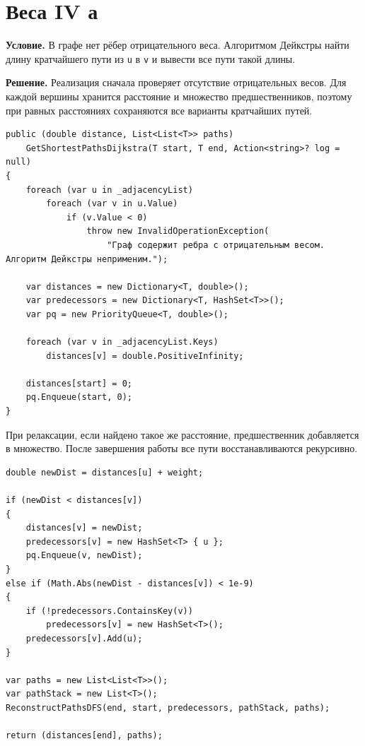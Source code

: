 \documentclass[pract]{SCWorks}
\newcommand{\smalltt}[1]{{\footnotesize\texttt{#1}}}
\begin{document}
    \section{Веса IV а}

    \textbf{Условие.}
    В графе нет рёбер отрицательного веса.
    Алгоритмом Дейкстры найти длину кратчайшего пути из \smalltt{u} в \smalltt{v} и вывести все пути такой длины.

    \textbf{Решение.}
    Реализация сначала проверяет отсутствие отрицательных весов.
    Для каждой вершины хранится расстояние и множество предшественников, поэтому при равных расстояниях сохраняются все варианты кратчайших путей.

    \begin{verbatim}
public (double distance, List<List<T>> paths)
    GetShortestPathsDijkstra(T start, T end, Action<string>? log = null)
{
    foreach (var u in _adjacencyList)
        foreach (var v in u.Value)
            if (v.Value < 0)
                throw new InvalidOperationException(
                    "Граф содержит ребра с отрицательным весом. Алгоритм Дейкстры неприменим.");

    var distances = new Dictionary<T, double>();
    var predecessors = new Dictionary<T, HashSet<T>>();
    var pq = new PriorityQueue<T, double>();

    foreach (var v in _adjacencyList.Keys)
        distances[v] = double.PositiveInfinity;

    distances[start] = 0;
    pq.Enqueue(start, 0);
}
    \end{verbatim}

    При релаксации, если найдено такое же расстояние, предшественник добавляется в множество.
    После завершения работы все пути восстанавливаются рекурсивно.

    \begin{verbatim}
double newDist = distances[u] + weight;

if (newDist < distances[v])
{
    distances[v] = newDist;
    predecessors[v] = new HashSet<T> { u };
    pq.Enqueue(v, newDist);
}
else if (Math.Abs(newDist - distances[v]) < 1e-9)
{
    if (!predecessors.ContainsKey(v))
        predecessors[v] = new HashSet<T>();
    predecessors[v].Add(u);
}

var paths = new List<List<T>>();
var pathStack = new List<T>();
ReconstructPathsDFS(end, start, predecessors, pathStack, paths);

return (distances[end], paths);
    \end{verbatim}
\end{document}
